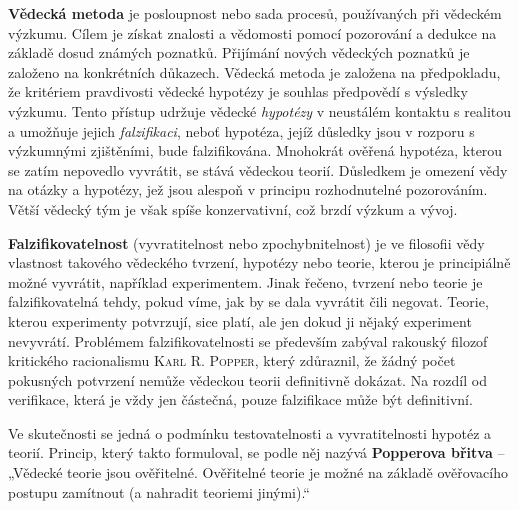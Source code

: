       \begin{tcnote}
        \textbf{Vědecká metoda} je posloupnost nebo sada procesů, používaných při vědeckém výzkumu.
        Cílem je získat znalosti a vědomosti pomocí pozorování a dedukce na základě dosud známých
        poznatků. Přijímání nových vědeckých poznatků je založeno na konkrétních důkazech. Vědecká
        metoda je založena na předpokladu, že kritériem pravdivosti vědecké hypotézy je souhlas
        předpovědí s výsledky výzkumu. Tento přístup udržuje vědecké \emph{hypotézy} v neustálém
        kontaktu s realitou a umožňuje jejich \emph{falzifikaci}, neboť hypotéza, jejíž důsledky
        jsou v rozporu s výzkumnými zjištěními, bude falzifikována. Mnohokrát ověřená hypotéza,
        kterou se zatím nepovedlo vyvrátit, se stává vědeckou teorií. Důsledkem je omezení vědy na
        otázky a hypotézy, jež jsou alespoň v principu rozhodnutelné pozorováním. Větší vědecký tým
        je však spíše konzervativní, což brzdí výzkum a vývoj.

        {\centering
        \captionsetup{type=figure}
        \label{fyz:fig0950}
        \par}

        \textbf{Falzifikovatelnost} (vyvratitelnost nebo zpochybnitelnost) je ve filosofii vědy
        vlastnost takového vědeckého tvrzení, hypotézy nebo teorie, kterou je principiálně možné
        vyvrátit, například experimentem. Jinak řečeno, tvrzení nebo teorie je falzifikovatelná
        tehdy, pokud víme, jak by se dala vyvrátit čili negovat. Teorie, kterou experimenty
        potvrzují, sice platí, ale jen dokud ji nějaký experiment nevyvrátí. Problémem
        falzifikovatelnosti se především zabýval rakouský filozof kritického racionalismu
        \textsc{Karl R. Popper}, který zdůraznil, že žádný počet pokusných potvrzení nemůže vědeckou
        teorii definitivně dokázat. Na rozdíl od verifikace, která je vždy jen částečná, pouze
        falzifikace může být definitivní.

        Ve skutečnosti se jedná o podmínku testovatelnosti a vyvratitelnosti hypotéz a teorií.
        Princip, který takto formuloval, se podle něj nazývá \textbf{Popperova břitva} – „Vědecké
        teorie jsou ověřitelné. Ověřitelné teorie je možné na základě ověřovacího postupu zamítnout
        (a nahradit teoriemi jinými).“


\end{tcnote}

